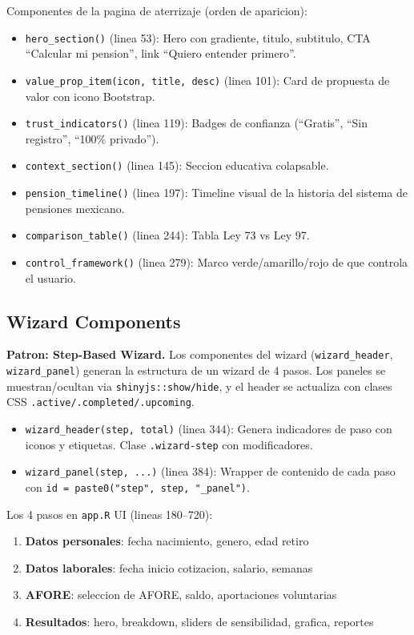 \documentclass[11pt, letterpaper, twoside]{report}
\begin{document}
\begin{codigobox}
Componentes de la pagina de aterrizaje (orden de aparicion):
\begin{itemize}[nosep]
\item \texttt{hero\_section()} (linea 53): Hero con gradiente, titulo, subtitulo,
      CTA ``Calcular mi pension'', link ``Quiero entender primero''.
\item \texttt{value\_prop\_item(icon, title, desc)} (linea 101): Card de propuesta
      de valor con icono Bootstrap.
\item \texttt{trust\_indicators()} (linea 119): Badges de confianza (``Gratis'',
      ``Sin registro'', ``100\% privado'').
\item \texttt{context\_section()} (linea 145): Seccion educativa colapsable.
\item \texttt{pension\_timeline()} (linea 197): Timeline visual de la historia
      del sistema de pensiones mexicano.
\item \texttt{comparison\_table()} (linea 244): Tabla Ley 73 vs Ley 97.
\item \texttt{control\_framework()} (linea 279): Marco verde/amarillo/rojo de
      que controla el usuario.
\end{itemize}
\end{codigobox}


\subsection{Wizard Components}

\begin{patronbox}
\textbf{Patron: Step-Based Wizard.} Los componentes del wizard
(\texttt{wizard\_header}, \texttt{wizard\_panel}) generan la estructura de un
wizard de 4 pasos. Los paneles se muestran/ocultan via \texttt{shinyjs::show/hide},
y el header se actualiza con clases CSS \texttt{.active/.completed/.upcoming}.
\end{patronbox}

\begin{codigobox}
\begin{itemize}[nosep]
\item \texttt{wizard\_header(step, total)} (linea 344): Genera indicadores de paso
      con iconos y etiquetas. Clase \texttt{.wizard-step} con modificadores.
\item \texttt{wizard\_panel(step, ...)} (linea 384): Wrapper de contenido de cada paso
      con \texttt{id = paste0("step", step, "\_panel")}.
\end{itemize}
Los 4 pasos en \texttt{app.R} UI (lineas 180--720):
\begin{enumerate}[nosep]
\item \textbf{Datos personales}: fecha nacimiento, genero, edad retiro
\item \textbf{Datos laborales}: fecha inicio cotizacion, salario, semanas
\item \textbf{AFORE}: seleccion de AFORE, saldo, aportaciones voluntarias
\item \textbf{Resultados}: hero, breakdown, sliders de sensibilidad, grafica, reportes
\end{enumerate}
\end{codigobox}
\end{document}
